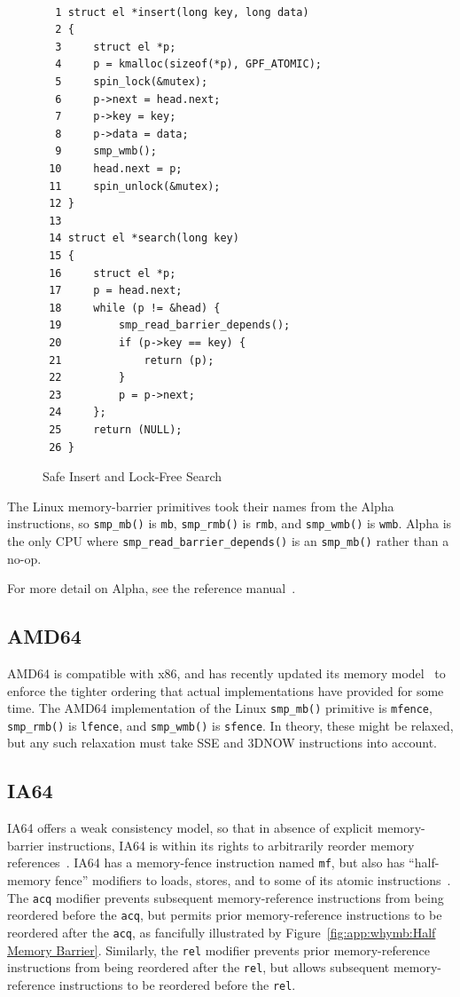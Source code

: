\begin{figure}
{\tt \scriptsize
\begin{verbatim}
  1 struct el *insert(long key, long data)
  2 {
  3     struct el *p;
  4     p = kmalloc(sizeof(*p), GPF_ATOMIC);
  5     spin_lock(&mutex);
  6     p->next = head.next;
  7     p->key = key;
  8     p->data = data;
  9     smp_wmb();
 10     head.next = p;
 11     spin_unlock(&mutex);
 12 }
 13
 14 struct el *search(long key)
 15 {
 16     struct el *p;
 17     p = head.next;
 18     while (p != &head) {
 19         smp_read_barrier_depends();
 20         if (p->key == key) {
 21             return (p);
 22         }
 23         p = p->next;
 24     };
 25     return (NULL);
 26 }
\end{verbatim}
}
\caption{Safe Insert and Lock-Free Search}
\label{fig:app:whymb:Safe Insert and Lock-Free Search}
\end{figure}

The Linux memory-barrier primitives took their names from the Alpha
instructions, so {\tt smp\_mb()} is {\tt mb}, {\tt smp\_rmb()} is {\tt rmb},
and {\tt smp\_wmb()} is {\tt wmb}.
Alpha is the only CPU where {\tt smp\_read\_barrier\_depends()} is
an {\tt smp\_mb()} rather than a no-op.

For more detail on Alpha, see the reference manual~\cite{ALPHA95}.

\subsection{AMD64}

AMD64 is compatible with x86, and has recently updated its memory
model~\cite{AMDOpteron:2:2007}
to enforce the tighter ordering that actual implementations have
provided for some time.
The AMD64 implementation of the Linux {\tt smp\_mb()} primitive is {\tt mfence},
{\tt smp\_rmb()} is {\tt lfence}, and {\tt smp\_wmb()} is {\tt sfence}.
In theory, these might be relaxed, but any such relaxation must take
SSE and 3DNOW instructions into account.

\subsection{IA64}

IA64 offers a weak consistency model, so that in absence of explicit
memory-barrier instructions, IA64 is within its rights to arbitrarily
reorder memory references~\cite{IntelItanium02v2}.
IA64 has a memory-fence instruction named {\tt mf}, but also has
``half-memory fence'' modifiers to loads, stores, and to some of its atomic
instructions~\cite{IntelItanium02v3}.
The {\tt acq} modifier prevents subsequent memory-reference instructions
from being reordered before the {\tt acq}, but permits
prior memory-reference instructions to be reordered after the {\tt acq},
as fancifully illustrated by Figure~\ref{fig:app:whymb:Half Memory Barrier}.
Similarly, the {\tt rel} modifier prevents prior memory-reference
instructions from being reordered after the {\tt rel}, but allows
subsequent memory-reference instructions to be reordered before
the {\tt rel}.

